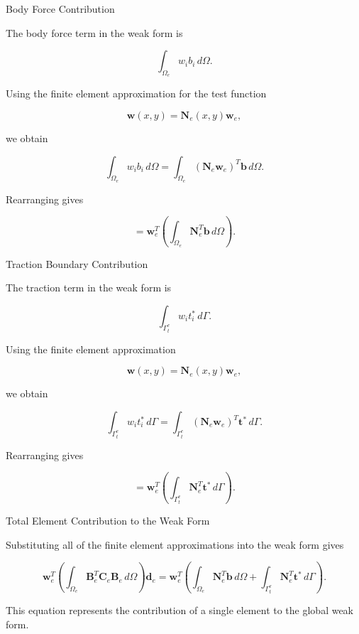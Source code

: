 \documentclass[aspectratio=169]{beamer}
\begin{document}
\begin{frame}{Body Force Contribution}

The body force term in the weak form is

\[
\int_{\Omega_e} w_i b_i \, d\Omega.
\]

Using the finite element approximation for the test function

\[
\mathbf{w}(x,y)=\mathbf{N}_e(x,y)\mathbf{w}_e,
\]

we obtain

\[
\int_{\Omega_e} w_i b_i \, d\Omega
=
\int_{\Omega_e}
(\mathbf{N}_e \mathbf{w}_e)^T \mathbf{b}
\, d\Omega.
\]

Rearranging gives

\[
=
\mathbf{w}_e^T
\left(
\int_{\Omega_e}
\mathbf{N}_e^T \mathbf{b}
\, d\Omega
\right).
\]

\end{frame}

\begin{frame}{Traction Boundary Contribution}

The traction term in the weak form is

\[
\int_{\Gamma_t^e} w_i t_i^* \, d\Gamma.
\]

Using the finite element approximation

\[
\mathbf{w}(x,y)=\mathbf{N}_e(x,y)\mathbf{w}_e,
\]

we obtain

\[
\int_{\Gamma_t^e} w_i t_i^* \, d\Gamma
=
\int_{\Gamma_t^e}
(\mathbf{N}_e \mathbf{w}_e)^T \mathbf{t}^*
\, d\Gamma.
\]

Rearranging gives

\[
=
\mathbf{w}_e^T
\left(
\int_{\Gamma_t^e}
\mathbf{N}_e^T \mathbf{t}^*
\, d\Gamma
\right).
\]

\end{frame}

\begin{frame}{Total Element Contribution to the Weak Form}

Substituting all of the finite element approximations into the weak form gives

\[
\mathbf{w}_e^T
\left(
\int_{\Omega_e}
\mathbf{B}_e^T
\mathbf{C}_e
\mathbf{B}_e
\, d\Omega
\right)
\mathbf{d}_e
=
\mathbf{w}_e^T
\left(
\int_{\Omega_e}
\mathbf{N}_e^T \mathbf{b}
\, d\Omega
+
\int_{\Gamma_t^e}
\mathbf{N}_e^T \mathbf{t}^*
\, d\Gamma
\right).
\]

This equation represents the contribution of a single element
to the global weak form.

\end{frame}
\end{document}
